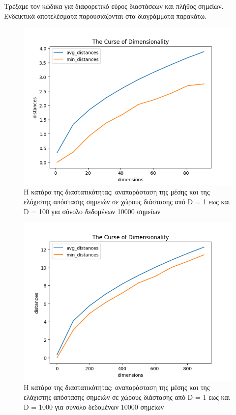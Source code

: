 \documentclass[12pt]{article}
\newenvironment{matlab}
	{\begin{figure}[H]\centering\captionsetup{justification=centering}}
	{\end{figure}}
\begin{document}
Τρέξαμε τον κώδικα για διαφορετικό εύρος διαστάσεων και πλήθος σημείων. Ενδεικτικά αποτελέσματα παρουσιάζονται στα διαγράμματα παρακάτω. \\

\begin{matlab}
	\includegraphics[scale=0.8]{images/the_curse_of_dimensionality_1_to_100.png}
	\caption{Η κατάρα της διαστατικότητας: αναπαράσταση της μέσης και της ελάχιστης απόστασης σημειών σε χώρους διάστασης από D = 1 εως και D = 100 για σύνολο δεδομένων 10000 σημείων}
\end{matlab}

\begin{matlab}
	\includegraphics[scale=0.8]{images/the_curse_of_dimensionality_1_to_1000.png}
	\caption{Η κατάρα της διαστατικότητας: αναπαράσταση της μέσης και της ελάχιστης απόστασης σημειών σε χώρους διάστασης από D = 1 εως και D = 1000 για σύνολο δεδομένων 10000 σημείων}
\end{matlab}
\end{document}
